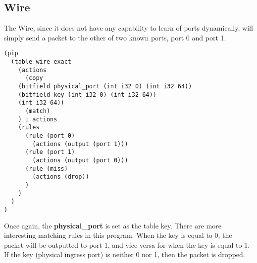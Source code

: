 \subsection{Wire}
The Wire, since it does not have any capability to learn of ports dynamically, will simply send a packet to the other of two known ports, port 0 and port 1.
\begin{verbatim}
(pip
  (table wire exact
    (actions
      (copy
	(bitfield physical_port (int i32 0) (int i32 64))
	(bitfield key (int i32 0) (int i32 64))
	(int i32 64))
      (match)
    ) ; actions
    (rules
      (rule (port 0)
        (actions (output (port 1)))
      (rule (port 1)
        (actions (output (port 0)))
      (rule (miss)
        (actions (drop))
      )
    )
  )
)
\end{verbatim}
Once again, the \textbf{physical\_port} is set as the table key. There are more interesting matching rules in this program. When the key is equal to 0, the packet will be outputted to port 1, and vice versa for when the key is equal to 1. If the key (physical ingress port) is neither 0 nor 1, then the packet is dropped.
